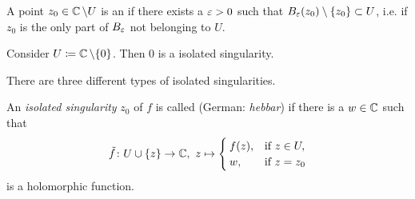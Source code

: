 \documentclass[a4paper,english]{article}
\begin{document}
\begin{defn}
    A point $z_0 \in \operatorname{\mathbb{C}} \setminus U$ is an  if there exists a $\varepsilon > 0$ such that $B_{\varepsilon}(z_0) \setminus \{ z_0 \} \subset U$, i.e. if $z_0$ is the only part of $B_{\varepsilon}$ not belonging to $U$.
\end{defn}

\begin{example}
    Consider $U \coloneqq \operatorname{\mathbb{C}} \setminus \{ 0 \}$.
    Then $0$ is a isolated singularity.
\end{example}

There are three different types of isolated singularities.

\begin{defn} \label{defn:remove}
    An \emph{isolated singularity} $z_0$ of $f$ is called  (German: \textit{hebbar}) if there is a $w \in \operatorname{\mathbb{C}}$ such that
    \begin{equation*}
        \tilde{f}\colon U \cup \{ z \} \to \CC, \ 
        z \mapsto \begin{cases}
            f(z),   & \text{if } z \in U, \\
            w,      & \text{if } z = z_0
        \end{cases}
    \end{equation*}
    is a holomorphic function.
\end{defn}
\end{document}
